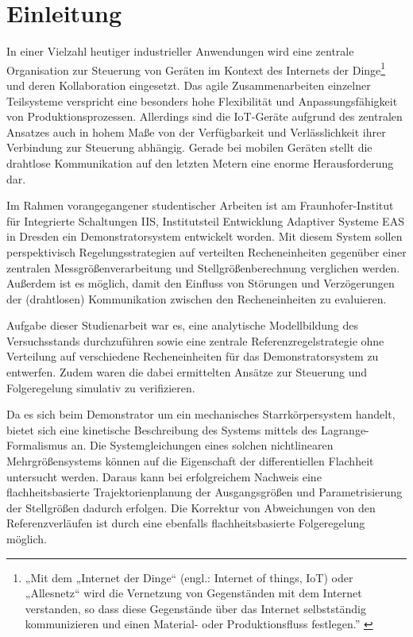 \pagestyle{scrheadings}

\chapter{Einleitung}

In einer Vielzahl heutiger industrieller Anwendungen wird eine zentrale Organisation zur Steuerung von Geräten im Kontext des Internets der Dinge\footnote{„Mit dem „Internet der Dinge“ (engl.: Internet of things, IoT) oder „Allesnetz“ wird die Vernetzung von 
Gegenständen mit dem Internet verstanden, so dass diese Gegenstände über das Internet 
selbstständig kommunizieren und einen Material- oder Produktionsfluss festlegen.'' \cite{BegriffeIndustrie40}} und deren Kollaboration eingesetzt. Das agile Zusammenarbeiten einzelner Teilsysteme verspricht eine besonders hohe Flexibilität und Anpassungsfähigkeit von Produktionsprozessen. Allerdings sind die IoT-Geräte aufgrund des zentralen Ansatzes auch in hohem Maße von der Verfügbarkeit und Verlässlichkeit ihrer Verbindung zur Steuerung abhängig. Gerade bei mobilen Geräten stellt die drahtlose Kommunikation auf den letzten Metern eine enorme Herausforderung dar.

Im Rahmen vorangegangener studentischer Arbeiten ist am Fraunhofer-Institut für Integrierte Schaltungen IIS, Institutsteil Entwicklung Adaptiver Systeme EAS \cite{fraunhoferIISEAS} in Dresden ein Demonstratorsystem entwickelt worden. Mit diesem System sollen perspektivisch Regelungsstrategien auf verteilten Recheneinheiten gegenüber einer zentralen Messgrößenverarbeitung und Stellgrößenberechnung verglichen werden. Außerdem ist es möglich, damit den Einfluss von Störungen und Verzögerungen der (drahtlosen) Kommunikation zwischen den Recheneinheiten zu evaluieren.

Aufgabe dieser Studienarbeit war es, eine analytische Modellbildung des Versuchsstands durchzuführen sowie eine zentrale Referenzregelstrategie ohne Verteilung auf verschiedene Recheneinheiten für das Demonstratorsystem zu entwerfen. Zudem waren die dabei ermittelten Ansätze zur Steuerung und Folgeregelung simulativ zu verifizieren.

Da es sich beim Demonstrator um ein mechanisches Starrkörpersystem handelt, bietet sich eine kinetische Beschreibung des Systems mittels des Lagrange-Formalismus an. Die Systemgleichungen eines solchen nichtlinearen Mehrgrößensystems können auf die Eigenschaft der differentiellen Flachheit untersucht werden. Daraus kann bei erfolgreichem Nachweis eine flachheitsbasierte Trajektorienplanung der Ausgangsgrößen und Parametrisierung der Stellgrößen dadurch erfolgen. Die Korrektur von Abweichungen von den Referenzverläufen ist durch eine ebenfalls flachheitsbasierte Folgeregelung möglich.


